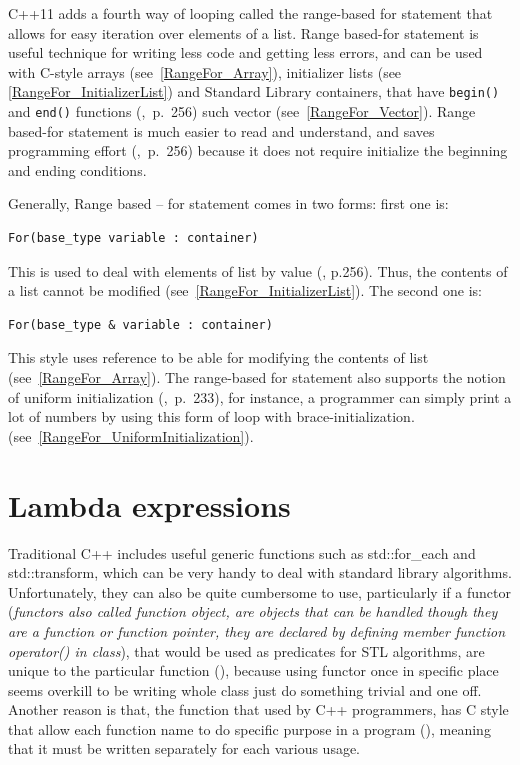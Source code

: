 \documentclass[11pt]{report}
\begin{document}
C++11 adds a fourth way of looping called the range-based for statement that allows for easy iteration over elements of a list. Range based-for statement is useful technique for writing less code and getting less errors, and can be used with C-style arrays (see~\ref{RangeFor_Array}), initializer lists (see \ref{RangeFor_InitializerList}) and Standard Library containers, that have  \texttt{begin()} and \texttt{end()} functions (\cite{Overland:2011:CWF},~p.~256) such vector (see~\ref{RangeFor_Vector}). Range based-for statement is much easier to read and understand, and saves programming effort (\cite{Overland:2011:CWF},~p.~256) because it does not require initialize the beginning and ending conditions.

Generally, Range based – for statement comes in two forms: first one is:
\begin{lstlisting}
For(base_type variable : container)
\end{lstlisting} 

This is used to deal with elements of list by value (\cite{Overland:2011:CWF}, p.256). Thus, the contents of a list cannot be modified (see~\ref{RangeFor_InitializerList}). The second one is:
\begin{lstlisting}
For(base_type & variable : container)
\end{lstlisting}

This style uses reference to be able for modifying the contents of list (see~\ref{RangeFor_Array}). The range-based for statement also supports the notion of uniform initialization (\cite{Prata:2012:Cpp},~p.~233), for instance, a programmer can simply print a lot of numbers by using this form of loop with brace-initialization. (see~\ref{RangeFor_UniformInitialization}).

\section{Lambda expressions}
\label{section: Lambda Expressions}
Traditional C++ includes useful generic functions such as std::for\_each and std::transform, which can be very handy to deal with standard library algorithms. Unfortunately, they can also be quite cumbersome to use, particularly if a functor (\emph{functors also called function object, are objects that can be handled though they are a function or function pointer, they are declared by defining member function operator() in class}), that would be used as predicates for STL algorithms, are unique to the particular function (\cite{Allain:2011:FutureCpp}), because using functor once in specific place seems overkill to be writing whole class just do something trivial and one off. Another reason is that, the function that used by C++ programmers, has C style that allow each function name to do specific purpose in a program (\cite{Cppreference:2012:Cpp11}), meaning that it must be written separately for each various usage.
\end{document}
